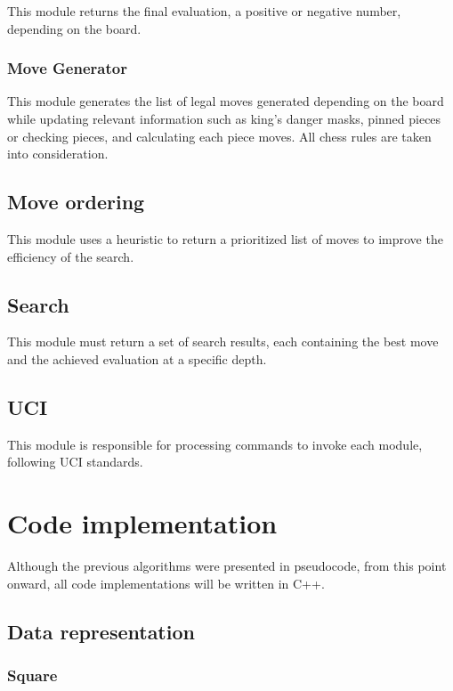 This module returns the final evaluation, a positive or negative number, depending on the board.

\subsubsection{Move Generator}

This module generates the list of legal moves generated depending on the board while updating relevant information such as king's danger masks, pinned pieces or checking pieces, and calculating each piece moves. All chess rules are taken into consideration.

\subsection{Move ordering}

This module uses a heuristic to return a prioritized list of moves to improve the efficiency of the search.

\subsection{Search}

This module must return a set of search results, each containing the best move and the achieved evaluation at a specific depth.

\subsection{UCI}

This module is responsible for processing commands to invoke each module, following UCI standards.

\section{Code implementation}
\label{sec:code}

Although the previous algorithms were presented in pseudocode, from this point onward, all code implementations will be written in C++.

\subsection{Data representation}

\subsubsection{Square}

